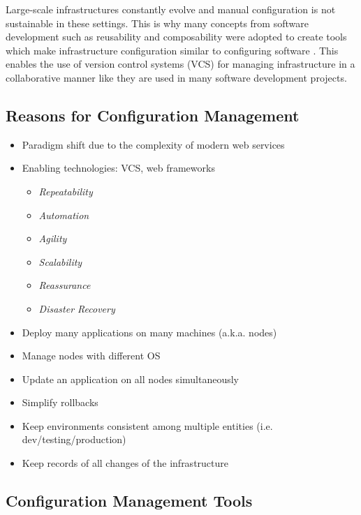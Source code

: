 Large-scale infrastructures constantly evolve and manual configuration is not sustainable in these settings. This is why many concepts from software development such as reusability and composability were adopted to create tools which make infrastructure configuration similar to configuring software \cite{kanies2006puppet}. This enables the use of version control systems (VCS) for managing infrastructure in a collaborative manner like they are used in many software development projects.

\subsection{Reasons for Configuration Management}

	\begin{itemize}
		\item Paradigm shift due to the complexity of modern web services
		\item Enabling technologies: VCS, web frameworks
			\begin{itemize}
			\item \textit{Repeatability}
			\item \textit{Automation}
			\item \textit{Agility}
			\item \textit{Scalability}
			\item \textit{Reassurance}
			\item \textit{Disaster Recovery}
			\end{itemize}
	\end{itemize}


	\begin{itemize}
		\item Deploy many applications on many machines (a.k.a. nodes)
		\item Manage nodes with different OS
		\item Update an application on all nodes simultaneously
		\item Simplify rollbacks
		\item Keep environments consistent among multiple entities (i.e. dev/testing/production)
		\item Keep records of all changes of the infrastructure
	\end{itemize}

\subsection{Configuration Management Tools}

